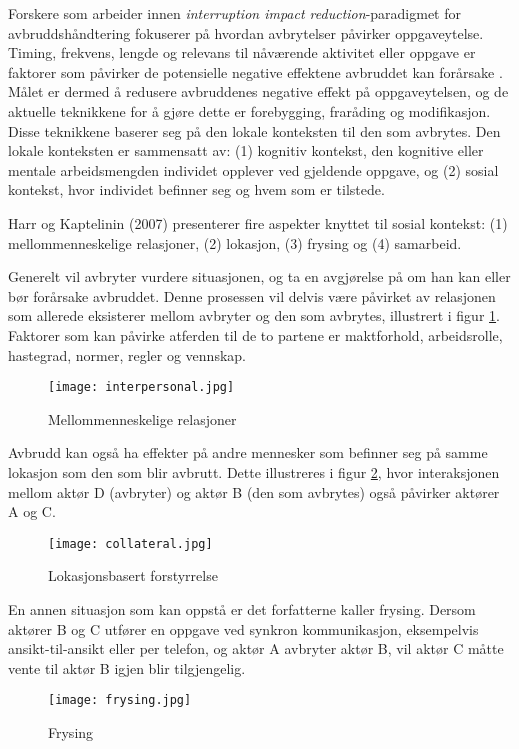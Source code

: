 \noindent
Forskere som arbeider innen \emph{interruption impact reduction}-paradigmet for avbruddshåndtering fokuserer på hvordan avbrytelser påvirker oppgaveytelse. Timing, frekvens, lengde og relevans til nåværende aktivitet eller oppgave er faktorer som påvirker de potensielle negative effektene avbruddet kan forårsake \citep{Grandhi10, Harr07}.
Målet er dermed å redusere avbruddenes negative effekt på oppgaveytelsen, og de aktuelle teknikkene for å gjøre dette er forebygging, fraråding og modifikasjon. Disse teknikkene baserer seg på den lokale konteksten til den som avbrytes. Den lokale konteksten er sammensatt av: (1) kognitiv kontekst, den kognitive eller mentale arbeidsmengden individet opplever ved gjeldende oppgave, og (2) sosial kontekst, hvor individet befinner seg og hvem som er tilstede. 
 
\noindent
Harr og Kaptelinin (2007) presenterer fire aspekter knyttet til sosial kontekst: (1) mellommenneskelige relasjoner, (2) lokasjon, (3) frysing og (4) samarbeid.

\noindent
Generelt vil avbryter vurdere situasjonen, og ta en avgjørelse på om han kan eller bør forårsake avbruddet. Denne prosessen vil delvis være påvirket av relasjonen som allerede eksisterer mellom avbryter og den som avbrytes, illustrert i figur \ref{interpersonal}. Faktorer som kan påvirke atferden til de to partene er maktforhold, arbeidsrolle, hastegrad, normer, regler og vennskap. 
\begin{figure}[H]
\centering
\texttt{[image: interpersonal.jpg]}
\caption{Mellommenneskelige relasjoner}
\label{interpersonal}
\end{figure}

\noindent
Avbrudd kan også ha effekter på andre mennesker som befinner seg på samme lokasjon som den som blir avbrutt. Dette illustreres i figur \ref{collateral}, hvor interaksjonen mellom aktør D (avbryter) og aktør B (den som avbrytes) også påvirker aktører A og C.
\begin{figure}[H]
\centering
\texttt{[image: collateral.jpg]}
\caption{Lokasjonsbasert forstyrrelse}
\label{collateral}
\end{figure}

\noindent
En annen situasjon som kan oppstå er det forfatterne kaller frysing. Dersom aktører B og C utfører en oppgave ved synkron kommunikasjon, eksempelvis ansikt-til-ansikt eller per telefon, og aktør A avbryter aktør B, vil aktør C måtte vente til aktør B igjen blir tilgjengelig. 
\begin{figure}[H]
\centering
\texttt{[image: frysing.jpg]}
\caption{Frysing}
\label{frysing}
\end{figure}

